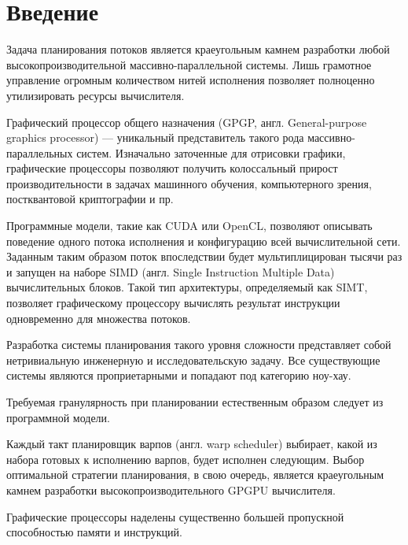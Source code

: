 \section{Введение}

Задача планирования потоков является краеугольным камнем разработки любой высокопроизводительной массивно-параллельной системы. Лишь грамотное управление огромным количеством нитей исполнения позволяет полноценно утилизировать ресурсы вычислителя.  

Графический процессор общего назначения (GPGP, англ. General-purpose graphics processor) --- уникальный представитель такого рода массивно-параллельных систем. Изначально заточенные для отрисовки графики, графические процессоры позволяют получить колоссальный прирост производительности в задачах машинного обучения, компьютерного зрения, постквантовой криптографии и пр.    

Программные модели, такие как CUDA\cite{CUDA_Article} или OpenCL\cite{OpenCL}, позволяют описывать поведение одного потока исполнения и конфигурацию всей вычислительной сети. Заданным таким образом поток впоследствии будет мультиплицирован тысячи раз и запущен на наборе SIMD (англ. Single Instruction Multiple Data) вычислительных блоков. Такой тип архитектуры, определяемый как SIMT\cite{SIMT}, позволяет графическому процессору вычислять результат инструкции одновременно для множества потоков. 

Разработка системы планирования такого уровня сложности представляет собой нетривиальную инженерную и исследовательскую задачу. Все существующие системы являются проприетарными и попадают под категорию ноу-хау. 

Требуемая гранулярность при планировании естественным образом следует из программной модели. 

Каждый такт планировщик варпов (англ. warp scheduler) выбирает, какой из набора готовых к исполнению варпов, будет исполнен следующим. Выбор оптимальной стратегии планирования, в свою очередь, является краеугольным камнем разработки высокопроизводительного GPGPU вычислителя.

Графические процессоры наделены существенно большей пропускной способностью памяти и инструкций.
